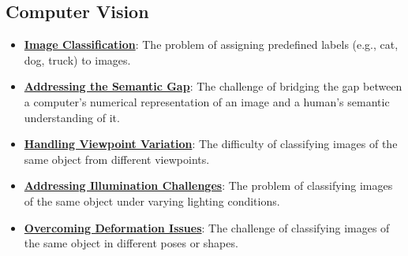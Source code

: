 \documentclass{article}%
\begin{document}
%
\subsection{Computer Vision}%
\label{subsec:ComputerVision}%
\begin{itemize}[leftmargin=*]%
\item \href{https://purdue.brightspace.com/d2l/common/assets/pdfjs-d2l-dist/1.0.14-legacy/web/viewer.html?file=\%2Fcontent\%2Fenforced\%2F1095467-wl.202510.CS.24300.001\%2F07L2-Vision.pdf\%3Fou\%3D1095467\&lang=en-us\&container=d2l-fileviewer-rendered-pdf\&fullscreen=d2l-fileviewer-rendered-pdf-dialog\&height=667#page=3}{\textbf{Image Classification}}: The problem of assigning predefined labels (e.g., cat, dog, truck) to images.%
\item \href{https://purdue.brightspace.com/d2l/common/assets/pdfjs-d2l-dist/1.0.14-legacy/web/viewer.html?file=\%2Fcontent\%2Fenforced\%2F1095467-wl.202510.CS.24300.001\%2F07L2-Vision.pdf\%3Fou\%3D1095467\&lang=en-us\&container=d2l-fileviewer-rendered-pdf\&fullscreen=d2l-fileviewer-rendered-pdf-dialog\&height=667#page=4}{\textbf{Addressing the Semantic Gap}}: The challenge of bridging the gap between a computer's numerical representation of an image and a human's semantic understanding of it.%
\item \href{https://purdue.brightspace.com/d2l/common/assets/pdfjs-d2l-dist/1.0.14-legacy/web/viewer.html?file=\%2Fcontent\%2Fenforced\%2F1095467-wl.202510.CS.24300.001\%2F07L2-Vision.pdf\%3Fou\%3D1095467\&lang=en-us\&container=d2l-fileviewer-rendered-pdf\&fullscreen=d2l-fileviewer-rendered-pdf-dialog\&height=667#page=6}{\textbf{Handling Viewpoint Variation}}: The difficulty of classifying images of the same object from different viewpoints.%
\item \href{https://purdue.brightspace.com/d2l/common/assets/pdfjs-d2l-dist/1.0.14-legacy/web/viewer.html?file=\%2Fcontent\%2Fenforced\%2F1095467-wl.202510.CS.24300.001\%2F07L2-Vision.pdf\%3Fou\%3D1095467\&lang=en-us\&container=d2l-fileviewer-rendered-pdf\&fullscreen=d2l-fileviewer-rendered-pdf-dialog\&height=667#page=7}{\textbf{Addressing Illumination Challenges}}: The problem of classifying images of the same object under varying lighting conditions.%
\item \href{https://purdue.brightspace.com/d2l/common/assets/pdfjs-d2l-dist/1.0.14-legacy/web/viewer.html?file=\%2Fcontent\%2Fenforced\%2F1095467-wl.202510.CS.24300.001\%2F07L2-Vision.pdf\%3Fou\%3D1095467\&lang=en-us\&container=d2l-fileviewer-rendered-pdf\&fullscreen=d2l-fileviewer-rendered-pdf-dialog\&height=667#page=8}{\textbf{Overcoming Deformation Issues}}: The challenge of classifying images of the same object in different poses or shapes.%

\end{itemize}
\end{document}
